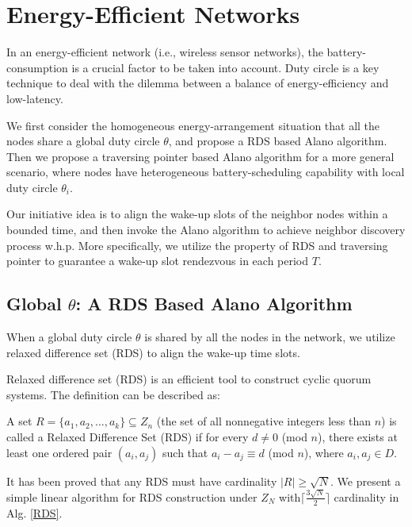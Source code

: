 \section{Energy-Efficient Networks}
\label{EEN}
In an energy-efficient network (i.e., wireless sensor networks), 
the battery-consumption is a crucial factor to be taken into account.
Duty circle is a key technique to deal with the dilemma between a 
balance of energy-efficiency and low-latency.


We first consider the homogeneous energy-arrangement situation
that  all the nodes share a global duty circle $\theta$, and propose
a RDS based Alano algorithm. Then we propose a traversing pointer 
based Alano algorithm for a more general scenario, 
where nodes have heterogeneous battery-scheduling 
capability with local duty circle $\theta_i$.

Our initiative idea is to align the wake-up slots of the neighbor nodes within a bounded time,
and then invoke the Alano algorithm to achieve neighbor discovery process w.h.p. 
More specifically, we utilize the property of RDS and traversing pointer to guarantee 
a wake-up slot rendezvous in each period $T$. 

\subsection{Global $\theta$: A RDS Based Alano Algorithm}

When a global duty circle $\theta$ is shared by all the nodes in the network,
we utilize relaxed difference set (RDS) to align the wake-up time slots.


Relaxed difference set (RDS) is an efficient tool to 
construct cyclic quorum systems\cite{jiang2005quorum,luk1997two}. The definition can be
described as:
\begin{definition}
A set $R=\{a_1,a_2,...,a_k\} \subseteq Z_n$ (the set of all nonnegative integers less than $n$) 
is called a Relaxed Difference Set (RDS) if for every $d \neq 0$ (mod $n$), 
there exists at least one ordered pair $(a_i,a_j)$ such that $a_i - a_j \equiv d$ (mod $n$), where $a_i,a_j \in D$.
\end{definition}

It has been proved that 
any RDS must have cardinality $|R| \geq \sqrt{N}$\cite{luk1997two}.
We present a simple linear algorithm for RDS construction under $Z_N$
with$\lceil \frac{3\sqrt{N}}{2}  \rceil$ cardinality in Alg. \ref{RDS}. 

